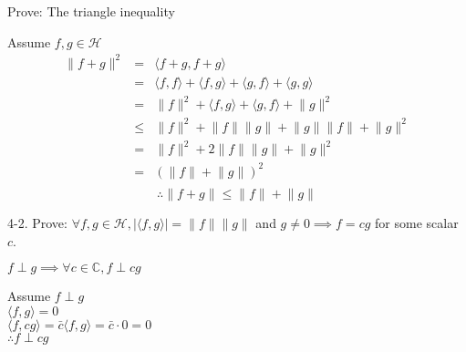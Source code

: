 \documentclass[letterpaper,12pt,fleqn]{article}
\newcommand{\abs}[1]{\left|#1\right|}
\newcommand{\norm}[1]{\lVert#1\rVert}
\newcommand{\inner}[2]{\langle#1,#2\rangle}
\newcommand{\conj}[1]{\bar{#1}}
\newcommand{\hilb}{\mathcal{H}}
\newcommand{\C}{\mathbb{C}}
\begin{document}
\begin{description}
Prove: The triangle inequality

\begin{theproof}
Assume $f,g\in\hilb$
\begin{eqnarray*}
\norm{f+g}^2 &=& \inner{f+g}{f+g} \\
    &=& \inner{f}{f}+\inner{f}{g}+\inner{g}{f}+\inner{g}{g} \\
    &=& \norm{f}^2+\inner{f}{g}+\inner{g}{f}+\norm{g}^2 \\
    &\le& \norm{f}^2+\norm{f}\norm{g}+\norm{g}\norm{f}+\norm{g}^2 \\
    &=& \norm{f}^2+2\norm{f}\norm{g}+\norm{g}^2 \\
    &=& \left(\norm{f}+\norm{g}\right)^2 \\
\end{eqnarray*}
\[\therefore \norm{f+g}\le\norm{f}+\norm{g}\]
\end{theproof}

\item{4-2.} Prove: $\forall f,g\in\hilb,
    \abs{\inner{f}{g}}=\norm{f}\norm{g}$ and
    $g\ne0\implies f=cg$ for some scalar $c$.

\begin{lemma}
$f\perp g\implies\forall c\in\C,f\perp cg$
\end{lemma}

\begin{theproof}
Assume $f\perp g$ \\
$\inner{f}{g}=0$ \\
$\inner{f}{cg}=\conj{c}\inner{f}{g}=\conj{c}\cdot0=0$ \\
$\therefore f\perp cg$
\end{theproof}


\end{description}
\end{document}
